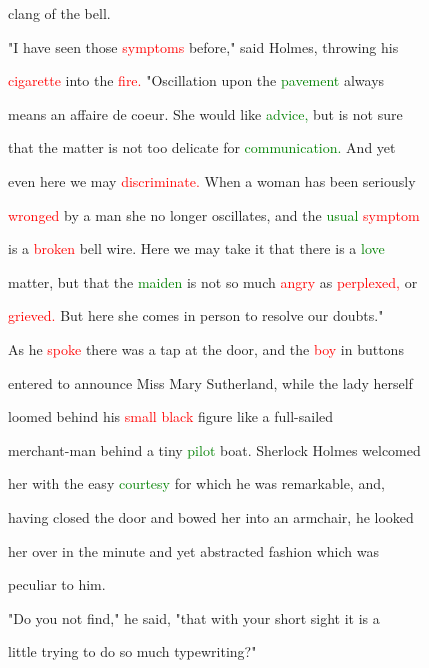  clang of the bell.



 "I have seen those \textcolor{red}{symptoms} before," said Holmes, throwing his

 \textcolor{red}{cigarette} into the \textcolor{red}{fire.} "Oscillation upon the \textcolor{green}{pavement} always

 means an affaire de coeur. She would like \textcolor{green}{advice,} but is not sure

 that the matter is not too delicate for \textcolor{green}{communication.} And yet

 even here we may \textcolor{red}{discriminate.} When a woman has been seriously

 \textcolor{red}{wronged} by a man she no longer oscillates, and the \textcolor{green}{usual} \textcolor{red}{symptom}

 is a \textcolor{red}{broken} bell wire. Here we may take it that there is a \textcolor{green}{love}

 matter, but that the \textcolor{green}{maiden} is not so much \textcolor{red}{angry} as \textcolor{red}{perplexed,} or

 \textcolor{red}{grieved.} But here she comes in person to resolve our \textcolor{BurntOrange}{doubts."}



 As he \textcolor{red}{spoke} there was a tap at the door, and the \textcolor{red}{boy} in buttons

 entered to announce Miss Mary Sutherland, while the lady herself

 \textcolor{BurntOrange}{loomed} behind his \textcolor{red}{small} \textcolor{red}{black} figure like a full-sailed

 merchant-man behind a tiny \textcolor{green}{pilot} boat. Sherlock Holmes welcomed

 her with the easy \textcolor{green}{courtesy} for which he was \textcolor{BurntOrange}{remarkable,} and,

 having closed the door and bowed her into an armchair, he looked

 her over in the minute and yet abstracted fashion which was

 peculiar to him.



 "Do you not find," he said, "that with your short sight it is a

 little trying to do so much typewriting?"



